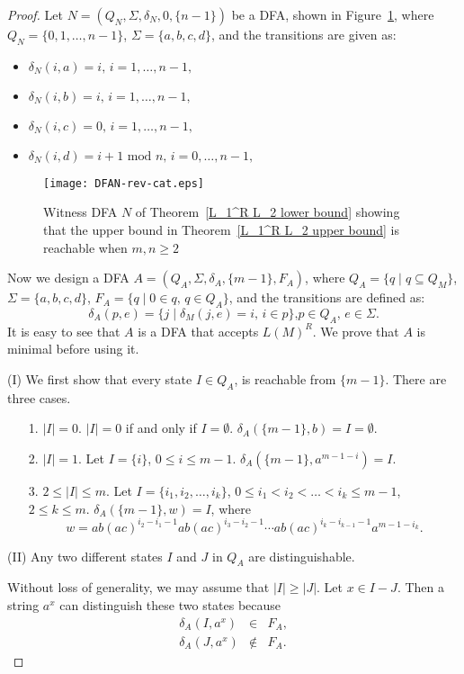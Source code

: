 \documentclass[10pt]{article}
\begin{document}
\begin{proof}
Let $N=(Q_N,\Sigma , \delta_N , 0, \{n-1\} )$ be a DFA, shown in
Figure~\ref{DFAN-rev-cat}, where $Q_N = \{0,1,\ldots ,n-1\}$,
$\Sigma = \{a,b,c,d\}$, and the transitions are given as:
\begin{itemize}
\item $\delta_N(i, a) = i \mbox{, } i=1, \ldots , n-1,$
\item $\delta_N(i, b) = i \mbox{, } i=1, \ldots , n-1,$
\item $\delta_N(i, c) = 0 \mbox{, } i=1, \ldots , n-1,$
\item $\delta_N(i, d) = i+1 \mbox{ mod }n \mbox{, } i=0, \ldots , n-1,$
\end{itemize}
\begin{figure}[ht]
  \begin{center}
  \texttt{[image: DFAN-rev-cat.eps]}
  \end{center}
  \caption{Witness DFA $N$ of Theorem~\ref{L_1^R L_2 lower bound} showing that the upper bound in Theorem~\ref{L_1^R L_2 upper bound} is reachable when $m, n \ge 2$}
\label{DFAN-rev-cat}
\end{figure}
Now we design a DFA $A=(Q_A, \Sigma , \delta_A , \{m-1\}, F_A )$,
where $Q_A = \{q \mid q\subseteq Q_M\}$, $\Sigma = \{a,b,c,d\}$,
$F_A = \{q \mid 0\in q \mbox{, }q\in Q_A\}$, and the transitions are
defined as:
\[
\delta_A(p, e) = \{j \mid \delta_M(j, e)=i\mbox{, }i\in p\} \mbox{,
} p\in Q_A\mbox{, } e \in \Sigma.
\]
It is easy to see that $A$ is a DFA that accepts $L(M)^R$. We prove
that $A$ is minimal before using it.

(I) We first show that every state $I\in Q_A$, is reachable from
$\{m-1\}$. There are three cases.


\begin{itemize}
\item[{\rm 1.}]$|I|=0$.
$|I|=0$ if and only if $I=\emptyset$. $\delta_A(\{ m-1 \}, b) =
I=\emptyset.$
\item[{\rm 2.}]$|I|=1$.
Let $I=\{ i \}$, $0\leq i\leq m-1$. $\delta_A(\{ m-1 \}, a^{m-1-i})
=I.$
\item[{\rm 3.}]$2\leq |I|\leq m$.
Let $I=\{ i_1, i_2, \ldots ,i_k \}$, $0\leq i_1<i_2< \ldots <i_k
\leq m-1$, $2\leq k\leq m$. $\delta_A(\{ m-1 \}, w) = I$, where
$$w = ab(ac)^{i_2-i_1-1}ab(ac)^{i_{3}-i_{2}-1}\cdots ab(ac)^{i_k-i_{k-1}-1}a^{m-1-i_k}.$$
\end{itemize}


(II) Any two different states $I$ and $J$ in $Q_A$ are
distinguishable.

Without loss of generality, we may assume that $|I|\geq |J|$. Let
$x\in I-J$. Then a string $a^{x}$ can distinguish these two states
because
\begin{eqnarray*}
\delta_A(I, a^{x})& \in & F_A,\\
\delta_A(J, a^{x}) & \notin & F_A.
\end{eqnarray*}


\end{proof}
\end{document}
